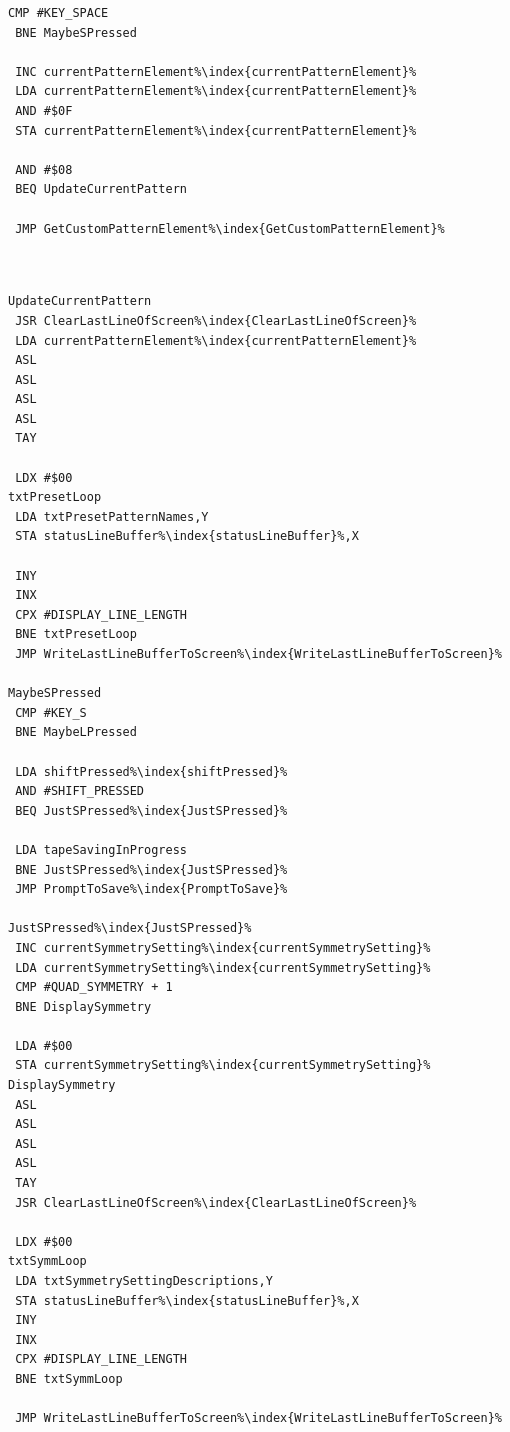 \begin{minipage}[b]{0.33\linewidth}
\begin{lrbox}{\mybox}
\begin{lstlisting}[basicstyle=\ttfamily\tiny,escapechar=\%]
 CMP #KEY_SPACE
 BNE MaybeSPressed

 INC currentPatternElement%\index{currentPatternElement}%
 LDA currentPatternElement%\index{currentPatternElement}%
 AND #$0F
 STA currentPatternElement%\index{currentPatternElement}%

 AND #$08
 BEQ UpdateCurrentPattern

 JMP GetCustomPatternElement%\index{GetCustomPatternElement}%



\end{lstlisting}
\end{lrbox}%
\scalebox{0.8}{\usebox{\mybox}}
\end{minipage}
\hspace{-0.1cm}
\begin{minipage}[b]{0.33\linewidth}
\begin{lrbox}{\mybox}%
\begin{lstlisting}[basicstyle=\ttfamily\tiny,escapechar=\%]
UpdateCurrentPattern
 JSR ClearLastLineOfScreen%\index{ClearLastLineOfScreen}%
 LDA currentPatternElement%\index{currentPatternElement}%
 ASL
 ASL
 ASL
 ASL
 TAY

 LDX #$00
txtPresetLoop
 LDA txtPresetPatternNames,Y
 STA statusLineBuffer%\index{statusLineBuffer}%,X

 INY
 INX
 CPX #DISPLAY_LINE_LENGTH
 BNE txtPresetLoop
 JMP WriteLastLineBufferToScreen%\index{WriteLastLineBufferToScreen}%

MaybeSPressed
 CMP #KEY_S
 BNE MaybeLPressed

 LDA shiftPressed%\index{shiftPressed}%
 AND #SHIFT_PRESSED
 BEQ JustSPressed%\index{JustSPressed}%

 LDA tapeSavingInProgress
 BNE JustSPressed%\index{JustSPressed}%
 JMP PromptToSave%\index{PromptToSave}%

JustSPressed%\index{JustSPressed}%
 INC currentSymmetrySetting%\index{currentSymmetrySetting}%
 LDA currentSymmetrySetting%\index{currentSymmetrySetting}%
 CMP #QUAD_SYMMETRY + 1
 BNE DisplaySymmetry

 LDA #$00
 STA currentSymmetrySetting%\index{currentSymmetrySetting}%
DisplaySymmetry
 ASL
 ASL
 ASL
 ASL
 TAY
 JSR ClearLastLineOfScreen%\index{ClearLastLineOfScreen}%

 LDX #$00
txtSymmLoop
 LDA txtSymmetrySettingDescriptions,Y
 STA statusLineBuffer%\index{statusLineBuffer}%,X
 INY
 INX
 CPX #DISPLAY_LINE_LENGTH
 BNE txtSymmLoop

 JMP WriteLastLineBufferToScreen%\index{WriteLastLineBufferToScreen}%


\end{lstlisting}
\end{lrbox}
\end{minipage}
